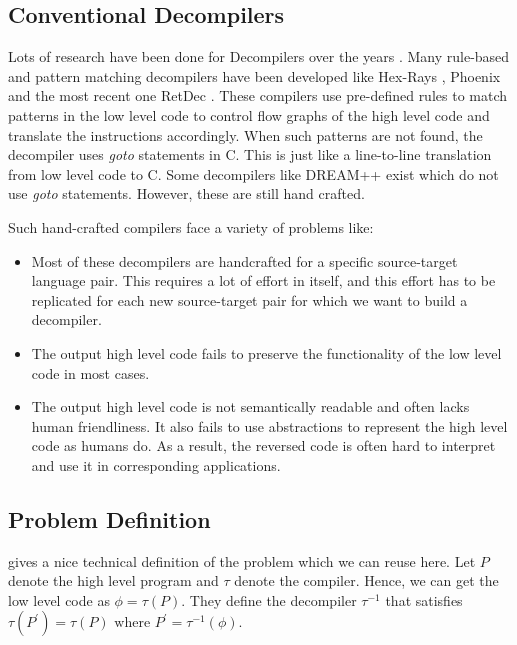 \documentclass{article}
\begin{document}
\subsection{Conventional Decompilers}
Lots of research have been done for Decompilers over the years \cite{cifuentes1994reverse, emmerik2004using,brumley2011bap,bao2014byteweight,rosenblum2008learning,yakdan2016helping,brumley2013native}. Many rule-based and pattern matching decompilers have been developed like Hex-Rays \cite{hexray}, Phoenix \cite{brumley2013native} and the most recent one RetDec \cite{kvroustek2017retdec}. These compilers use pre-defined rules to match patterns in the low level code to control flow graphs of the high level code and translate the instructions accordingly. When such patterns are not found, the decompiler uses \textit{goto} statements in C. This is just like a line-to-line translation from low level code to C. Some decompilers like DREAM++ \cite{yakdan2015no,yakdan2016helping} exist which do not use \textit{goto} statements. However, these are still hand crafted.

Such hand-crafted compilers face a variety of problems like:
\begin{itemize}
    \item Most of these decompilers are handcrafted for a specific source-target language pair. This requires a lot of effort in itself, and this effort has to be replicated for each new source-target pair for which we want to build a decompiler.
    \item The output high level code fails to preserve the functionality of the low level code in most cases.
    \item The output high level code is not semantically readable and often lacks human friendliness. It also fails to use abstractions to represent the high level code as humans do. As a result, the reversed code is often hard to interpret and use it in corresponding applications.
\end{itemize}

\subsection{Problem Definition}
\citet{coda} gives a nice technical definition of the problem which we can reuse here. Let $P$ denote the high level program and $\tau$ denote the compiler. Hence, we can get the low level code as $\phi = \tau(P)$. They define the decompiler $\tau^{-1}$ that satisfies $\tau(P^{'}) = \tau(P) \text{ where } P^{'} = \tau^{-1}(\phi)$.
\end{document}
